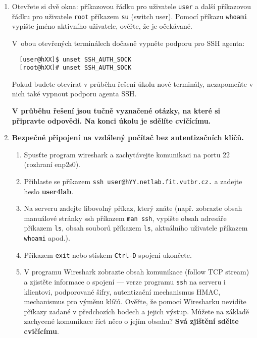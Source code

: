 \documentclass[a4paper,11pt]{article}
\begin{document}
\begin{enumerate}

  \item Otevřete si dvě okna: příkazovou řádku pro uživatele {\tt user} a další
    příkazovou řádku pro uživatele {\tt root} příkazem {\tt su} (switch user).
Pomocí příkazu {\tt whoami} vypište jméno aktivního uživatele, ověřte, že je
    očekávané.

    V~obou otevřených terminálech dočasně vypněte podporu pro SSH agenta:
  \begin{lstlisting}
  [user@hXX]$ unset SSH_AUTH_SOCK
  [root@hXX]# unset SSH_AUTH_SOCK
  \end{lstlisting}

  Pokud budete otevírat v průběhu řešení úkolu nové terminály, nezapomeňte
  v nich také vypnout podporu agenta SSH.

  {\bf V průběhu řešení jsou tučně vyznačené otázky, na které si připravte odpovědi.
  Na konci úkolu je sdělíte cvičícímu.}

  \item {\bf Bezpečné připojení na vzdálený počítač bez autentizačních klíčů.}

    \begin{enumerate}

      \item Spusťte program wireshark a zachytávejte komunikaci na portu 22
        (rozhraní enp2s0).

      \item Přihlaste se příkazem {\tt ssh user@hYY.netlab.fit.vutbr.cz.} a zadejte heslo \textbf{user4lab}.

      \item Na serveru zadejte libovolný příkaz, který znáte (např. zobrazte
        obsah manuálové stránky ssh příkazem {\tt man ssh}, vypište
        obsah adresáře příkazem {\tt ls}, obsah souborů příkazem {\tt ls},
        aktuálního uživatele příkazem {\tt whoami} apod.).

      \item Příkazem {\tt exit} nebo stiskem {\tt Ctrl-D} spojení ukončete.

      \item V programu Wireshark zobrazte obsah komunikace (follow TCP stream) a
        zjistěte informace o spojení --- verze programu {\tt ssh} na serveru i
        klientovi, podporované šifry, autentizační mechanismus HMAC, mechanismus
        pro výměnu klíčů. Ověřte, že pomocí Wiresharku nevidíte příkazy zadané v
        předchozích bodech a jejich výstup. Můžete na základě zachycené
        komunikace říct něco o jejím obsahu? {\bf Svá zjištění sdělte cvičícímu}.


\end{enumerate}
\end{enumerate}
\end{document}
